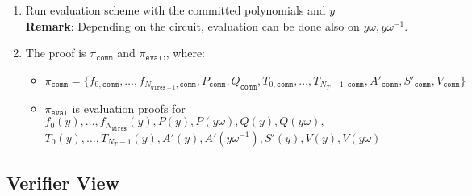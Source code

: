 \begin{enumerate}
    \item Run evaluation scheme with the committed polynomials and $y$ \\
        \textbf{Remark}: Depending on the circuit, evaluation can be done also on $y\omega, y\omega^{-1}$.
    \item The proof is $\pi_{\texttt{comm}}$ and $\pi_{\texttt{eval}}$,, where:
        \begin{itemize}
            \item $\pi_{\texttt{comm}} = \{f_{0, \texttt{comm}}, \dots, f_{N_{\texttt{wires} - 1}, \texttt{comm}},
                    P_{\texttt{comm}}, Q_{\texttt{comm}}, T_{0, \texttt{comm}}, ..., T_{N_T - 1, \texttt{comm}},
                A'_{\texttt{comm}}, S'_{\texttt{comm}}, V_{\texttt{comm}} \}$
            \item  $\pi_{\texttt{eval}}$ is evaluation proofs for $f_0(y), \dots, f_{N_{\texttt{wires}}}(y),
                P(y), P(y\omega), Q(y), Q(y\omega),$ \\
                $T_0(y), \dots, T_{N_T - 1}(y), A'(y), A'(y\omega^{-1}), S'(y), V(y), V(y\omega)$
        \end{itemize}
\end{enumerate}

\subsection{Verifier View}\label{section:protocol:verifier}

